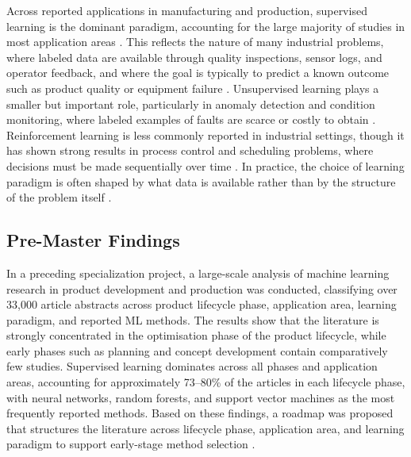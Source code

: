 Across reported applications in manufacturing and production, supervised learning 
is the dominant paradigm, accounting for the large majority of studies in most 
application areas \parencite{wuest2016ml_manufacturing, adekoya2022applications_ai_em}. 
This reflects the nature of many industrial problems, where labeled data are available 
through quality inspections, sensor logs, and operator feedback, and where the goal 
is typically to predict a known outcome such as product quality or equipment failure 
\parencite{wuest2016ml_manufacturing, presciuttini2024ml_iot_manufacturing_operations}. 
Unsupervised learning plays a smaller but important role, particularly in anomaly 
detection and condition monitoring, where labeled examples of faults are scarce or 
costly to obtain \parencite{presciuttini2024ml_iot_manufacturing_operations}. 
Reinforcement learning is less commonly reported in industrial settings, though it 
has shown strong results in process control and scheduling problems, where decisions 
must be made sequentially over time \parencite{panzer2022deep_reinforcement_learning_production_systems}. 
In practice, the choice of learning paradigm is often shaped by what data is available 
rather than by the structure of the problem itself 
\parencite{wuest2016ml_manufacturing}.

\subsection{Pre-Master Findings}

In a preceding specialization project, a large-scale analysis of machine learning 
research in product development and production was conducted, classifying over 33,000 
article abstracts across product lifecycle phase, application area, learning paradigm, 
and reported ML methods. 
The results show that the literature is strongly concentrated in the optimisation
phase of the product lifecycle, while early phases such as planning and concept 
development contain comparatively few studies. 
Supervised learning dominates across all phases and application areas, accounting 
for approximately 73--80\% of the articles in each lifecycle phase, 
with neural networks, random forests, and support vector machines as the most 
frequently reported methods. 
Based on these findings, a roadmap was proposed that structures the literature 
across lifecycle phase, application area, and learning paradigm to support 
early-stage method selection \parencite{bergsto2026mlselection}.